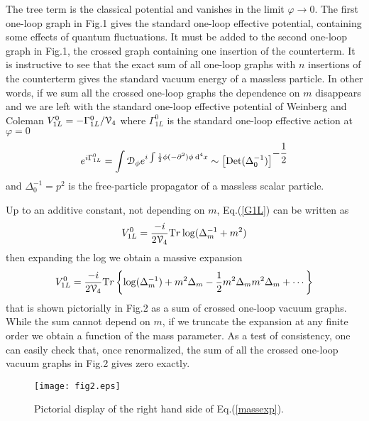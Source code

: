 \documentclass[aps,preprint]{revtex4}
\newcommand{\BE}{\begin{equation}}
\newcommand{\EE}{\end{equation}}
\newcommand{\Tr}{\mathrm Tr}
\begin{document}
The tree term is the classical potential and vanishes in the limit $\varphi\to 0$. The first one-loop graph
in Fig.1 gives the standard one-loop effective potential, containing some effects of quantum fluctuations.
It must be added to the second one-loop graph in Fig.1, the crossed graph containing one insertion of the
counterterm. It is instructive to see that the exact sum of all one-loop graphs with $n$ insertions of the
counterterm gives the standard vacuum energy of a massless particle. In other words, if we sum all the crossed
one-loop graphs the dependence on $m$ disappears and we are left with the standard one-loop effective potential
of Weinberg and Coleman\cite{WC} $V_{1L}^0=-\Gamma_{1L}^0/{\cal V}_4$ where $\Gamma_{1L}^0$ is the standard
one-loop effective action at $\varphi=0$
\BE
e^{i\Gamma_{1L}^0}=\int {\cal D}_{\phi} e^{i \int \frac{1}{2} \phi (-\partial^2)\phi \>{\rm d}^4x}
\sim\left[{\rm Det}(\Delta_0^{-1})\right]^{\displaystyle{-\frac{1}{2}}}
\label{G1L}
\EE
and $\Delta_0^{-1}=p^2$ is the free-particle propagator of a massless scalar particle.

Up to an additive constant, not depending on $m$, Eq.(\ref{G1L}) can be written as
\BE
V^0_{1L}=\frac{-i}{2{\cal V}_4}\Tr \log(\Delta_m^{-1}+m^2)
\EE
then expanding the log we obtain a massive expansion
\BE
V^0_{1L}=\frac{-i}{2{\cal V}_4} \Tr\left\{ \log(\Delta_m^{-1})+ m^2\Delta_m
-\frac{1}{2}m^2\Delta_m m^2\Delta_m+\cdots\right\}
\label{massexp}
\EE
that is shown pictorially in Fig.2 as a sum of crossed one-loop vacuum graphs. While the sum cannot depend on
$m$, if we truncate the expansion at any finite order we obtain a function of the mass parameter.
As a test of consistency, one can easily check that, once renormalized, the sum of all the crossed 
one-loop vacuum graphs in Fig.2 gives zero exactly.

\begin{figure}[b] 
\centering
\texttt{[image: fig2.eps]}
\caption{Pictorial display of the right hand side of Eq.(\ref{massexp}).}
\label{fig2}
\end{figure}
\end{document}

